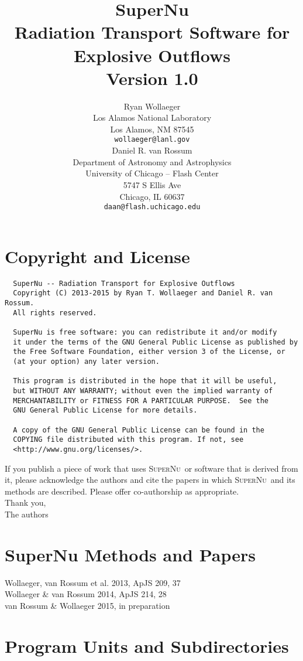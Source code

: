 \documentclass{article}
\title{{\Huge SuperNu}\\
Radiation Transport Software for Explosive Outflows\\
Version 1.0}
\author{Ryan Wollaeger\\
Los Alamos National Laboratory\\
Los Alamos, NM 87545\\
{\tt wollaeger@lanl.gov}\\[24pt]
Daniel R. van Rossum\\
Department of Astronomy and Astrophysics\\
University of Chicago -- Flash Center\\
5747 S Ellis Ave\\
Chicago, IL 60637\\
{\tt daan@flash.uchicago.edu}\\[24pt]
}
\newcommand{\supernu}{\textsc{SuperNu}}
\begin{document}


\maketitle
\vfill
\section{Copyright and License}
\begin{verbatim}
  SuperNu -- Radiation Transport for Explosive Outflows
  Copyright (C) 2013-2015 by Ryan T. Wollaeger and Daniel R. van Rossum.
  All rights reserved.

  SuperNu is free software: you can redistribute it and/or modify
  it under the terms of the GNU General Public License as published by
  the Free Software Foundation, either version 3 of the License, or
  (at your option) any later version.

  This program is distributed in the hope that it will be useful,
  but WITHOUT ANY WARRANTY; without even the implied warranty of
  MERCHANTABILITY or FITNESS FOR A PARTICULAR PURPOSE.  See the
  GNU General Public License for more details.

  A copy of the GNU General Public License can be found in the
  COPYING file distributed with this program. If not, see
  <http://www.gnu.org/licenses/>.
\end{verbatim}

\noindent
If you publish a piece of work that uses \supernu\ or software that is derived from it, please acknowledge the authors and cite the papers in which \supernu\ and its methods are described.  Please offer co-authorship as appropriate.
\vspace{1pt}\\
Thank you,\\
\indent
The authors

\section{SuperNu Methods and Papers}
Wollaeger, van Rossum et al. 2013, ApJS 209, 37\\
Wollaeger \& van Rossum 2014, ApJS 214, 28\\
van Rossum \& Wollaeger 2015, in preparation\\

\section{Program Units and Subdirectories}
\end{document}
